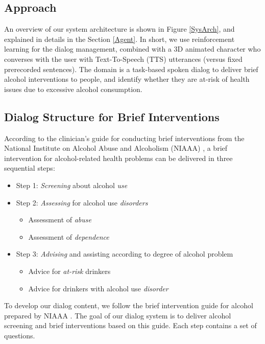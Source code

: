 \begin{sloppy}
\section{Approach}

An overview of our system architecture is shown in Figure \ref{SysArch}, and explained in details in the Section \ref{Agent}.  In short, we use reinforcement learning for the dialog management, combined with a 3D animated character who converses with the user with Text-To-Speech (TTS) utterances (versus fixed prerecorded sentences). The domain is a task-based spoken dialog to deliver brief alcohol interventions to people, and identify whether they are at-risk of health issues due to excessive alcohol consumption.  

\subsection{Dialog Structure for Brief Interventions }
\label{BIInteraction}

According to the clinician's guide for conducting brief interventions from the National Institute on Alcohol Abuse and Alcoholism (NIAAA) \cite{national2007helping}, a brief intervention for alcohol-related health problems can be delivered in three sequential steps:

\begin{itemize}
\item Step 1: {\em Screening} about alcohol {\em use}
\item Step 2: {\em Assessing} for alcohol use {\em disorders}
\begin{itemize}
\item Assessment of {\em abuse}
\item Assessment of {\em dependence}
\end{itemize}

\item Step 3: {\em Advising} and assisting according to degree of alcohol problem
\begin{itemize}
\item Advice for {\em at-risk} drinkers 
\item Advice for drinkers with alcohol use {\em disorder} 
\end{itemize}
\end{itemize}

To develop our dialog content, we follow the brief intervention guide for alcohol prepared by NIAAA \cite{national2006niaaa}. 
The goal of our dialog system is to deliver alcohol screening and brief interventions based on this guide. Each step contains a set of questions. 


\end{sloppy}
